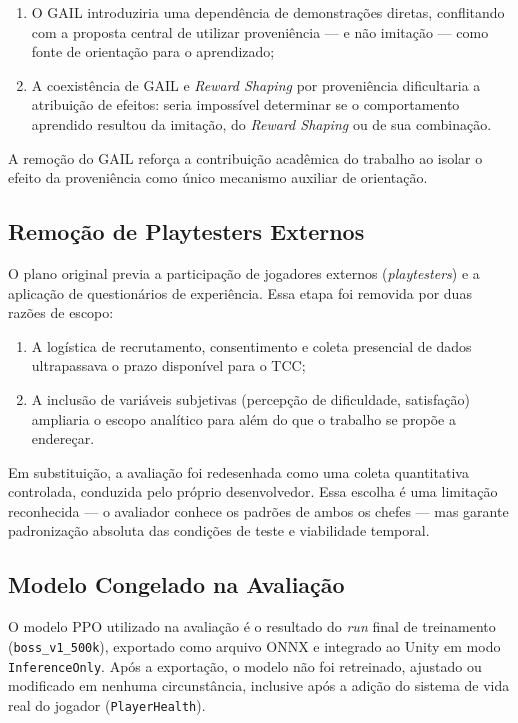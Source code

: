 \begin{enumerate}
    \item O GAIL introduziria uma dependência de demonstrações diretas,
          conflitando com a proposta central de utilizar proveniência --- e
          não imitação --- como fonte de orientação para o aprendizado;
    \item A coexistência de GAIL e \textit{Reward Shaping} por proveniência
          dificultaria a atribuição de efeitos: seria impossível determinar
          se o comportamento aprendido resultou da imitação, do
          \textit{Reward Shaping} ou de sua combinação.
\end{enumerate}

A remoção do GAIL reforça a contribuição acadêmica do trabalho ao isolar o
efeito da proveniência como único mecanismo auxiliar de orientação.

\subsection{Remoção de Playtesters Externos}
\label{subsec:remocao-playtesters}

O plano original previa a participação de jogadores externos
(\textit{playtesters}) e a aplicação de questionários de experiência. Essa
etapa foi removida por duas razões de escopo:

\begin{enumerate}
    \item A logística de recrutamento, consentimento e coleta presencial de
          dados ultrapassava o prazo disponível para o TCC;
    \item A inclusão de variáveis subjetivas (percepção de dificuldade,
          satisfação) ampliaria o escopo analítico para além do que o
          trabalho se propõe a endereçar.
\end{enumerate}

Em substituição, a avaliação foi redesenhada como uma coleta quantitativa
controlada, conduzida pelo próprio desenvolvedor. Essa escolha é uma limitação
reconhecida --- o avaliador conhece os padrões de ambos os chefes --- mas
garante padronização absoluta das condições de teste e viabilidade temporal.

\subsection{Modelo Congelado na Avaliação}
\label{subsec:modelo-congelado}

O modelo PPO utilizado na avaliação é o resultado do \textit{run} final de
treinamento (\texttt{boss\_v1\_500k}), exportado como arquivo ONNX e
integrado ao Unity em modo \texttt{InferenceOnly}. Após a exportação, o
modelo não foi retreinado, ajustado ou modificado em nenhuma circunstância,
inclusive após a adição do sistema de vida real do jogador
(\texttt{PlayerHealth}).

